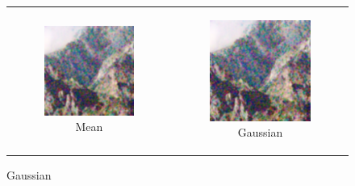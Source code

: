 \begin{figure}
\begin{tabular}{cc}
    \begin{subfigure}{0.3\textwidth}
      \includegraphics[width=\linewidth]{inc/research/complex/denoised_mean.png}
      \caption{Mean}
    \end{subfigure} &
    \begin{subfigure}{0.3\textwidth}
      \includegraphics[width=\linewidth]{inc/research/complex/denoised_gaussian.png}
      \caption{Gaussian}
    \end{subfigure} \\
    

\end{tabular}
\end{figure}
